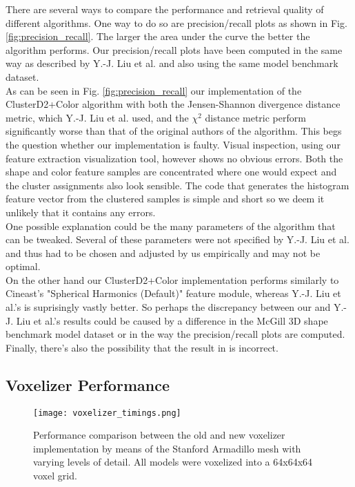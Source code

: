 There are several ways to compare the performance and retrieval quality of different algorithms. One way to do so are precision/recall plots as shown in Fig. \ref{fig:precision_recall}. The larger the area under the
curve the better the algorithm performs. Our precision/recall plots have been computed in the same way as described by Y.-J. Liu et al. \cite{cluster_d2_color} and also using the same model benchmark dataset.\\
As can be seen in Fig. \ref{fig:precision_recall} our implementation of the ClusterD2+Color algorithm with both the Jensen-Shannon divergence distance metric, which Y.-J. Liu et al. used,
and the $\chi^2$ distance metric perform significantly worse than that of the original authors of the algorithm. This begs the question whether our implementation is faulty. Visual inspection, using our feature
extraction visualization tool, however shows no obvious errors. Both the shape and color feature samples are concentrated where one would expect and the cluster assignments also look sensible. The code that generates
the histogram feature vector from the clustered samples is simple and short so we deem it unlikely that it contains any errors.\\
One possible explanation could be the many parameters of the algorithm that can be tweaked. Several of these parameters were not specified by Y.-J. Liu et al. and thus had to be chosen and adjusted by us empirically
and may not be optimal.\\
On the other hand our ClusterD2+Color implementation performs similarly to Cineast's "Spherical Harmonics (Default)" feature module, whereas Y.-J. Liu et al.'s is suprisingly vastly better.
So perhaps the discrepancy between our and Y.-J. Liu et al.'s results could be caused by a difference in the McGill 3D shape benchmark model dataset \cite{mcgill_shape_benchmark} or in the way the precision/recall plots are computed. Finally, there's also the possibility that the result in \cite{cluster_d2_color} is incorrect.

\subsection{Voxelizer Performance}

\begin{figure}
\centering
\captionsetup{width=0.8\textwidth}
\texttt{[image: voxelizer\_timings.png]}
\caption{Performance comparison between the old and new voxelizer implementation by means of the \cite{stanford_scan_repo} Stanford Armadillo mesh with varying levels of detail. All models were voxelized into a 64x64x64 voxel grid.}
\label{fig:voxelizer_timings}
\end{figure}

